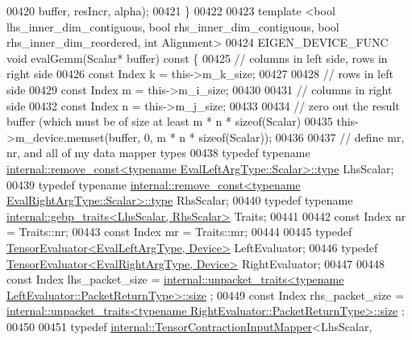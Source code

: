 \begin{DoxyCode}
00420         buffer, resIncr, alpha);
00421   \}
00422 
00423   \textcolor{keyword}{template} <\textcolor{keywordtype}{bool} lhs\_inner\_dim\_contiguous, \textcolor{keywordtype}{bool} rhs\_inner\_dim\_contiguous, \textcolor{keywordtype}{bool} rhs\_inner\_dim\_reordered, \textcolor{keywordtype}{int}
       Alignment>
00424   EIGEN\_DEVICE\_FUNC \textcolor{keywordtype}{void} evalGemm(Scalar* buffer)\textcolor{keyword}{ const }\{
00425     \textcolor{comment}{// columns in left side, rows in right side}
00426     \textcolor{keyword}{const} Index k = this->m\_k\_size;
00427 
00428     \textcolor{comment}{// rows in left side}
00429     \textcolor{keyword}{const} Index m = this->m\_i\_size;
00430 
00431     \textcolor{comment}{// columns in right side}
00432     \textcolor{keyword}{const} Index n = this->m\_j\_size;
00433 
00434     \textcolor{comment}{// zero out the result buffer (which must be of size at least m * n * sizeof(Scalar)}
00435     this->m\_device.memset(buffer, 0, m * n * \textcolor{keyword}{sizeof}(Scalar));
00436 
00437     \textcolor{comment}{// define mr, nr, and all of my data mapper types}
00438     \textcolor{keyword}{typedef} \textcolor{keyword}{typename} 
      \hyperlink{group___sparse_core___module}{internal::remove\_const<typename EvalLeftArgType::Scalar>::type}
       LhsScalar;
00439     \textcolor{keyword}{typedef} \textcolor{keyword}{typename} 
      \hyperlink{group___sparse_core___module}{internal::remove\_const<typename EvalRightArgType::Scalar>::type}
       RhsScalar;
00440     \textcolor{keyword}{typedef} \textcolor{keyword}{typename} \hyperlink{class_eigen_1_1internal_1_1gebp__traits}{internal::gebp\_traits<LhsScalar, RhsScalar>}
       Traits;
00441 
00442     \textcolor{keyword}{const} Index nr = Traits::nr;
00443     \textcolor{keyword}{const} Index mr = Traits::mr;
00444 
00445     \textcolor{keyword}{typedef} \hyperlink{struct_eigen_1_1_tensor_evaluator}{TensorEvaluator<EvalLeftArgType, Device>} LeftEvaluator;
00446     \textcolor{keyword}{typedef} \hyperlink{struct_eigen_1_1_tensor_evaluator}{TensorEvaluator<EvalRightArgType, Device>} 
      RightEvaluator;
00447 
00448     \textcolor{keyword}{const} Index lhs\_packet\_size = 
      \hyperlink{struct_eigen_1_1internal_1_1unpacket__traits}{internal::unpacket\_traits<typename LeftEvaluator::PacketReturnType>::size}
      ;
00449     \textcolor{keyword}{const} Index rhs\_packet\_size = 
      \hyperlink{struct_eigen_1_1internal_1_1unpacket__traits}{internal::unpacket\_traits<typename RightEvaluator::PacketReturnType>::size}
      ;
00450 
00451     \textcolor{keyword}{typedef} \hyperlink{class_eigen_1_1internal_1_1_tensor_contraction_input_mapper}{internal::TensorContractionInputMapper}<LhsScalar, 

\end{DoxyCode}
